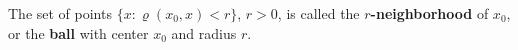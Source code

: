 The set of points $\{x : \varrho(x_0, x) < r\}$, $r > 0$, is called the \textbf{$r$-neighborhood} of $x_0$, or the \textbf{ball} with center $x_0$ and radius $r$.

